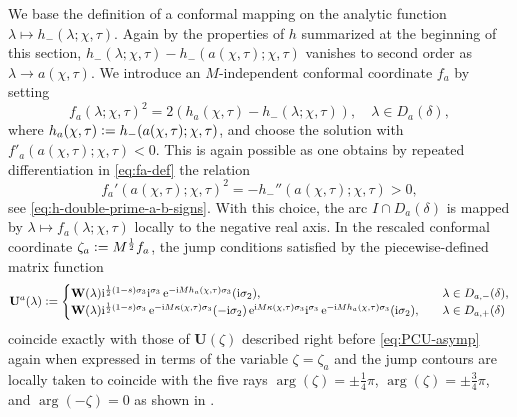 We base the definition of a conformal mapping on the analytic function $\lambda\mapsto {h}_-(\lambda;\chi,\tau)$. Again by the properties of $h$ summarized at the beginning of this section, ${h}_-(\lambda;\chi,\tau)-{h}_-(a(\chi,\tau);\chi,\tau)$ vanishes to second order as $\lambda\to a(\chi,\tau)$. We introduce an $M$-independent conformal coordinate $f_a$ by setting
\begin{equation}
f_a(\lambda;\chi,\tau)^2 = 2(h_a(\chi,\tau) - h_-(\lambda;\chi,\tau)),\quad \lambda\in D_a(\delta),
\label{eq:fa-def}
\end{equation}
where $h_a(\chi,\tau)\vcentcolon= h_{-}(a(\chi,\tau);\chi,\tau)$,
and choose the solution with $f'_a(a(\chi,\tau);\chi,\tau)<0$. This is again possible as one obtains by repeated differentiation in \eqref{eq:fa-def} the relation
\begin{equation}
f_a'(a(\chi,\tau);\chi,\tau)^2= - h_-''(a(\chi,\tau);\chi,\tau) >0,
\label{eq:fa-prime-h-double-prime}
\end{equation}
see \eqref{eq:h-double-prime-a-b-signs}.
With this choice,
the arc $I \cap D_a(\delta)$ is mapped by $\lambda \mapsto f_a(\lambda ;\chi,\tau)$ locally to the negative real axis. In the rescaled conformal coordinate $\zeta_a \vcentcolon= M^\frac{1}{2} f_a$, the jump conditions satisfied by the piecewise-defined matrix function
\begin{equation}
\mathbf{U}^a(\lambda) \vcentcolon= \begin{cases} 
\mathbf{W} (\lambda)
\mathrm{i}^{\frac{1}{2}(1-s)\sigma_3}  \mathrm{i}^{\sigma_3} \,\mathrm{e}^{-\mathrm{i} M {h}_a(\chi,\tau)\sigma_3}(\mathrm{i} \sigma_2),\quad& \lambda\in D_{a,-}(\delta),\\
\mathbf{W}(\lambda) \mathrm{i}^{\frac{1}{2}(1-s)\sigma_3} \,\mathrm{e}^{-\mathrm{i} M \kappa(\chi,\tau)\sigma_3}(-\mathrm{i} \sigma_2)  \,\mathrm{e}^{\mathrm{i} M \kappa(\chi,\tau)\sigma_3}  \mathrm{i}^{\sigma_3} \,\mathrm{e}^{-\mathrm{i} M {h}_a(\chi,\tau)\sigma_3}(\mathrm{i} \sigma_2), \quad & \lambda \in D_{a,+}(\delta)
\end{cases}
\label{eq:W-transformation-a}
\end{equation}
coincide exactly with those of $\mathbf{U}(\zeta)$ described right before \eqref{eq:PCU-asymp} again when expressed in terms of the variable $\zeta=\zeta_a$ and the jump contours are locally taken to coincide with the five rays $\arg(\zeta)=\pm \tfrac{1}{4}\pi$, $\arg(\zeta)=\pm \tfrac{3}{4}\pi$, and $\arg(-\zeta)=0$ as shown in \cite[Figure 9]{BilmanLM20}. 
